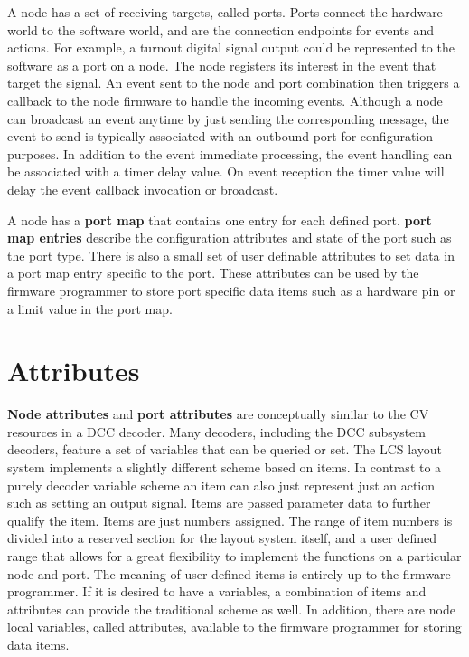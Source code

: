 A node has a set of receiving targets, called ports. Ports connect the hardware world to the software world, and are the connection endpoints for events and actions. For example, a turnout digital signal output could be represented to the software as a port on a node. The node registers its interest in the event that target the signal. An event sent to the node and port combination then triggers a callback to the node firmware to handle the incoming events. Although a node can broadcast an event anytime by just sending the corresponding message, the event to send is typically associated with an outbound port for configuration purposes. In addition to the event immediate processing, the event handling can be associated with a timer delay value. On event reception the timer value will delay the event callback invocation or broadcast.

A node has a {\bf port map} that contains one entry for each defined port. {\bf port map entries} describe the configuration attributes and state of the port such as the port type. There is also a small set of user definable attributes to set data in a port map entry specific to the port. These attributes can be used by the firmware programmer to store port specific data items such as a hardware pin or a limit value in the port map.

\section{Attributes}

{\bf Node attributes} and {\bf port attributes} are conceptually similar to the CV resources in a DCC decoder. Many decoders, including the DCC subsystem decoders, feature a set of variables that can be queried or set. The LCS layout system implements a slightly different scheme based on items. In contrast to a purely decoder variable scheme an item can also just represent just an action such as setting an output signal. Items are passed parameter data to further qualify the item. Items are just numbers assigned. The range of item numbers is divided into a reserved section for the layout system itself, and a user defined range that allows for a great flexibility to implement the functions on a particular node and port. The meaning of user defined items is entirely up to the firmware programmer. If it is desired to have a variables, a combination of items and attributes can provide the traditional scheme as well. In addition, there are node local variables, called attributes, available to the firmware programmer for storing data items.

